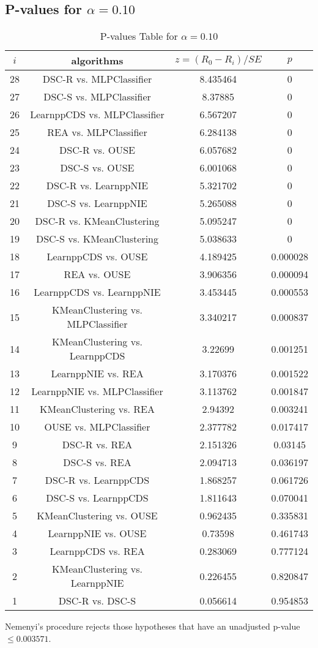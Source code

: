 \documentclass[a4paper,10pt]{article}
\begin{document}
\begin{landscape}
\pagebreak

\subsection{P-values for $\alpha=0.10$}

\begin{table}[!htp]
\centering\scriptsize
\begin{tabular}{cccc}
$i$&algorithms&$z=(R_0 - R_i)/SE$&$p$\\
\hline28&DSC-R vs. MLPClassifier&8.435464&0\\
27&DSC-S vs. MLPClassifier&8.37885&0\\
26&LearnppCDS vs. MLPClassifier&6.567207&0\\
25&REA vs. MLPClassifier&6.284138&0\\
24&DSC-R vs. OUSE&6.057682&0\\
23&DSC-S vs. OUSE&6.001068&0\\
22&DSC-R vs. LearnppNIE&5.321702&0\\
21&DSC-S vs. LearnppNIE&5.265088&0\\
20&DSC-R vs. KMeanClustering&5.095247&0\\
19&DSC-S vs. KMeanClustering&5.038633&0\\
18&LearnppCDS vs. OUSE&4.189425&0.000028\\
17&REA vs. OUSE&3.906356&0.000094\\
16&LearnppCDS vs. LearnppNIE&3.453445&0.000553\\
15&KMeanClustering vs. MLPClassifier&3.340217&0.000837\\
14&KMeanClustering vs. LearnppCDS&3.22699&0.001251\\
13&LearnppNIE vs. REA&3.170376&0.001522\\
12&LearnppNIE vs. MLPClassifier&3.113762&0.001847\\
11&KMeanClustering vs. REA&2.94392&0.003241\\
10&OUSE vs. MLPClassifier&2.377782&0.017417\\
9&DSC-R vs. REA&2.151326&0.03145\\
8&DSC-S vs. REA&2.094713&0.036197\\
7&DSC-R vs. LearnppCDS&1.868257&0.061726\\
6&DSC-S vs. LearnppCDS&1.811643&0.070041\\
5&KMeanClustering vs. OUSE&0.962435&0.335831\\
4&LearnppNIE vs. OUSE&0.73598&0.461743\\
3&LearnppCDS vs. REA&0.283069&0.777124\\
2&KMeanClustering vs. LearnppNIE&0.226455&0.820847\\
1&DSC-R vs. DSC-S&0.056614&0.954853\\
\hline
\end{tabular}
\caption{P-values Table for $\alpha=0.10$}
\end{table}Nemenyi's procedure rejects those hypotheses that have an unadjusted p-value $\le0.003571$.


\end{landscape}
\end{document}
